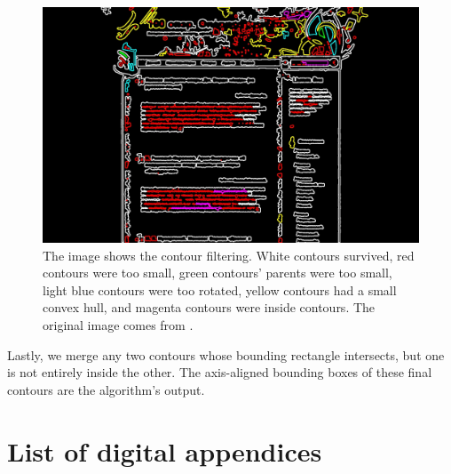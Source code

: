 \documentclass[
  digital,     %
  oneside,     %
  nosansbold,  %
  nocolorbold, %
  lof,         %
  lot,         %
]{fithesis4}
\begin{document}
\begin{figure}
    \centering
    \includegraphics[width=1\linewidth]{diagrams/filter.jpg}
    \caption{The image shows the contour filtering. White contours survived, red contours were too small, green contours' parents were too small, light blue contours were too rotated, yellow contours had a small convex hull, and magenta contours were inside contours. The original image comes from \cite{aydos2020}.}
    \label{fig:filtering}
\end{figure}

Lastly, we merge any two contours whose bounding rectangle intersects, but one is not entirely inside the other. The axis-aligned bounding boxes of these final contours are the algorithm's output.

\chapter{List of digital appendices}
\end{document}
